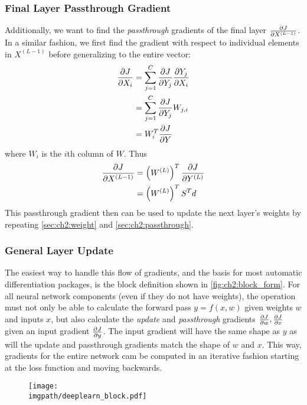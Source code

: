 \subsubsection{Final Layer Passthrough Gradient} \label{sec:ch2:passthrough}
Additionally, we want to find the \emph{passthrough} gradients of the final
layer $\frac{\partial J}{\partial X^{(L-1)}}$. In a similar fashion, we first find the gradient
with respect to individual elements in $X^{(L-1)}$ before generalizing to the
entire vector:
\begin{align}
  \frac{\partial J}{\partial X_i} &= \sum_{j=1}^{C} \frac{\partial J}{\partial Y_j} \frac{\partial Y_j}{\partial X_i} \\
                &= \sum_{j=1}^{C} \frac{\partial J}{\partial Y_j} W_{j,i} \\
                &= W_{i}^T\frac{\partial J}{\partial Y} \\
\end{align}
where $W_i$ is the $i$th column of $W$. Thus
\begin{align}
  \frac{\partial J}{\partial X^{(L-1)}} &= \left(W^{(L)}\right)^T \frac{\partial J}{\partial Y^{(L)}} \\
                      &= \left( W^{(L)} \right)^T S^T d
\end{align}
This passthrough gradient then can be used to update the next layer's weights by
repeating \autoref{sec:ch2:weight} and \autoref{sec:ch2:passthrough}.

\subsubsection{General Layer Update}
The easiest way to handle this flow of gradients, and the basis for most
automatic differentiation packages, is the block definition shown in
\autoref{fig:ch2:block_form}. For all neural network components (even if they do
not have weights), the operation must not only be able to calculate the forward 
pass $y=f(x, w)$ given weights $w$ and inputs $x$, but also calculate the
\emph{update} and \emph{passthrough} gradients $\frac{\partial J}{\partial w}, \frac{\partial J}{\partial x}$ given
an input gradient $\frac{\partial J}{\partial y}$. The input gradient will have the same shape as
$y$ as will the update and passthrough gradients match the shape of $w$ and $x$.
This way, gradients for the entire network cam be computed in an iterative
fashion starting at the loss function and moving backwards.

\begin{figure}
  \centering
  \texttt{[image: \\imgpath/deeplearn\_block.pdf]}
  \label{fig:ch2:block_form}
\end{figure}

